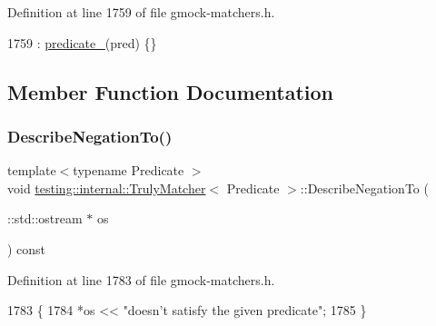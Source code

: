 Definition at line 1759 of file gmock-\/matchers.\+h.


\begin{DoxyCode}
1759 : \hyperlink{classtesting_1_1internal_1_1TrulyMatcher_a5697cfc685ae7c8c690838650bdd2d0c}{predicate\_}(pred) \{\}
\end{DoxyCode}


\subsection{Member Function Documentation}
\mbox{\label{classtesting_1_1internal_1_1TrulyMatcher_a2e753f5d571b6a51b8ef620dcbb3a591}} 
\subsubsection{\texorpdfstring{Describe\+Negation\+To()}{DescribeNegationTo()}}
{\footnotesize\ttfamily template$<$typename Predicate $>$ \\
void \hyperlink{classtesting_1_1internal_1_1TrulyMatcher}{testing\+::internal\+::\+Truly\+Matcher}$<$ Predicate $>$\+::Describe\+Negation\+To (\begin{DoxyParamCaption}\item[{\+::std\+::ostream $\ast$}]{os }\end{DoxyParamCaption}) const\hspace{0.3cm}{\ttfamily [inline]}}



Definition at line 1783 of file gmock-\/matchers.\+h.


\begin{DoxyCode}
1783                                                 \{
1784     *os << \textcolor{stringliteral}{"doesn't satisfy the given predicate"};
1785   \}
\end{DoxyCode}
\mbox{\label{classtesting_1_1internal_1_1TrulyMatcher_ac327b4bd408386f489c4279e7e3f9530}} 

